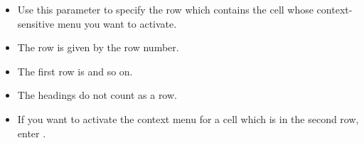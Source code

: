 \begin{itemize}
\item Use this parameter to specify the row which contains the cell whose context-sensitive menu you want to activate.
\item The row is given by the row number.
\item The first row is  and so on.
\item The headings do not count as a row. 
\item If you want to activate the context menu for  a cell which is in the second row, enter . 
\end{itemize}    
